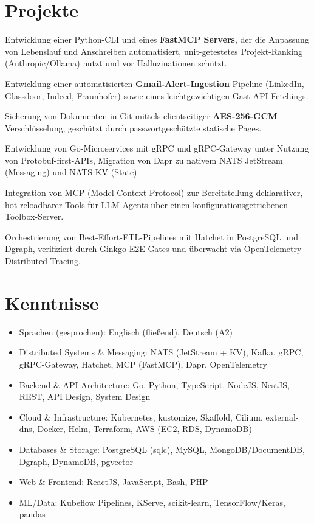 \documentclass[10pt,a4paper]{resume}
\begin{document}
\section{Projekte}

\bullets
  \item Entwicklung einer Python-CLI und eines \textbf{FastMCP Servers}, der die Anpassung von Lebenslauf und Anschreiben automatisiert, unit-getestetes Projekt-Ranking (Anthropic/Ollama) nutzt und vor Halluzinationen schützt.
  \item Entwicklung einer automatisierten \textbf{Gmail-Alert-Ingestion}-Pipeline (LinkedIn, Glassdoor, Indeed, Fraunhofer) sowie eines leichtgewichtigen Gast-API-Fetchings.
  \item Sicherung von Dokumenten in Git mittels clientseitiger \textbf{AES-256-GCM}-Verschlüsselung, geschützt durch passwortgeschützte statische Pages.
\bulletsend
\vspace{1.0pt}
\bullets
  \item Entwicklung von Go-Microservices mit gRPC und gRPC-Gateway unter Nutzung von Protobuf-first-APIs, Migration von Dapr zu nativem NATS JetStream (Messaging) und NATS KV (State).
  \item Integration von MCP (Model Context Protocol) zur Bereitstellung deklarativer, hot-reloadbarer Tools für LLM-Agents über einen konfigurationsgetriebenen Toolbox-Server.
  \item Orchestrierung von Best-Effort-ETL-Pipelines mit Hatchet in PostgreSQL und Dgraph, verifiziert durch Ginkgo-E2E-Gates und überwacht via OpenTelemetry-Distributed-Tracing.
\bulletsend

\section{Kenntnisse}

\begin{itemize}[leftmargin=1.4em,nosep,topsep=2pt]
  \item Sprachen (gesprochen): Englisch (fließend), Deutsch (A2)
  \item Distributed Systems \& Messaging: NATS (JetStream + KV), Kafka, gRPC, gRPC-Gateway, Hatchet, MCP (FastMCP), Dapr, OpenTelemetry
  \item Backend \& API Architecture: Go, Python, TypeScript, NodeJS, NestJS, REST, API Design, System Design
  \item Cloud \& Infrastructure: Kubernetes, kustomize, Skaffold, Cilium, external-dns, Docker, Helm, Terraform, AWS (EC2, RDS, DynamoDB)
  \item Databases \& Storage: PostgreSQL (sqlc), MySQL, MongoDB/DocumentDB, Dgraph, DynamoDB, pgvector
  \item Web \& Frontend: ReactJS, JavaScript, Bash, PHP
  \item ML/Data: Kubeflow Pipelines, KServe, scikit-learn, TensorFlow/Keras, pandas
\end{itemize}
\end{document}
